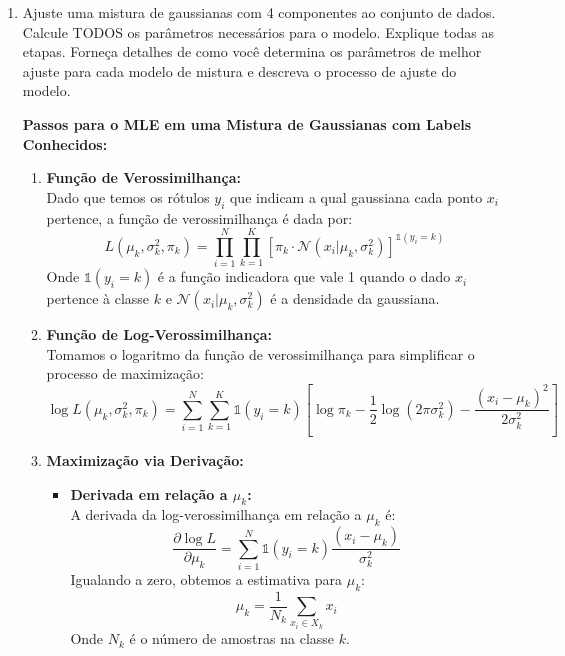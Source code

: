 \begin{enumerate}
\item Ajuste uma mistura de gaussianas com 4 componentes ao conjunto de dados. Calcule TODOS os parâmetros necessários para o modelo. Explique todas as etapas. Forneça detalhes de como você determina os parâmetros de melhor ajuste para cada modelo de mistura e descreva o processo de ajuste do modelo.

\begin{tcolorbox}[colback=white, colframe=black, title=Resposta:]
    \textbf{Passos para o MLE em uma Mistura de Gaussianas com Labels Conhecidos:}

    \begin{enumerate}
        \item \textbf{Função de Verossimilhança:} \\
        Dado que temos os rótulos \( y_i \) que indicam a qual gaussiana cada ponto \( x_i \) pertence, a função de verossimilhança é dada por:
        \[
        L(\mu_k, \sigma_k^2, \pi_k) = \prod_{i=1}^{N} \prod_{k=1}^{K} \left[ \pi_k \cdot \mathcal{N}(x_i | \mu_k, \sigma_k^2) \right]^{\mathbb{1}(y_i = k)}
        \]
        Onde \( \mathbb{1}(y_i = k) \) é a função indicadora que vale 1 quando o dado \( x_i \) pertence à classe \( k \) e \( \mathcal{N}(x_i | \mu_k, \sigma_k^2) \) é a densidade da gaussiana.
    
        \item \textbf{Função de Log-Verossimilhança:} \\
        Tomamos o logaritmo da função de verossimilhança para simplificar o processo de maximização:
        \[
        \log L(\mu_k, \sigma_k^2, \pi_k) = \sum_{i=1}^{N} \sum_{k=1}^{K} \mathbb{1}(y_i = k) \left[ \log \pi_k - \frac{1}{2} \log (2\pi \sigma_k^2) - \frac{(x_i - \mu_k)^2}{2\sigma_k^2} \right]
        \]
    
        \item \textbf{Maximização via Derivação:}
        \begin{itemize}
            \item \textbf{Derivada em relação a \( \mu_k \):} \\
            A derivada da log-verossimilhança em relação a \( \mu_k \) é:
            \[
            \frac{\partial \log L}{\partial \mu_k} = \sum_{i=1}^{N} \mathbb{1}(y_i = k) \frac{(x_i - \mu_k)}{\sigma_k^2}
            \]
            Igualando a zero, obtemos a estimativa para \( \mu_k \):
            \[
            \mu_k = \frac{1}{N_k} \sum_{x_i \in X_k} x_i
            \]
            Onde \( N_k \) é o número de amostras na classe \( k \).
    

\end{itemize}
\end{enumerate}
\end{tcolorbox}
\end{enumerate}
